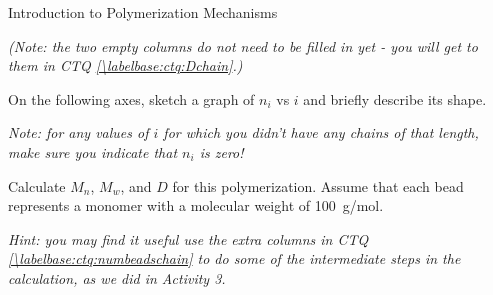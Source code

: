 \begin{activity}{Introduction to Polymerization Mechanisms}
\begin{ctqs}
		\emph{(Note: the two empty columns do not need to be filled in yet - you will get to them in CTQ \ref{\labelbase:ctq:Dchain}.)}
		
	\question On the following axes, sketch a graph of $n_i$ vs $i$ and briefly describe its shape. \label{\labelbase:ctq:MWDchain}
	
		\emph{Note: for any values of $i$ for which you didn't have any chains of that length, make sure you indicate that $n_i$ is zero!}
	
		\begin{solution}[2.5in]\end{solution}
	
	\question Calculate $M_n$, $M_w$, and $D$ for this polymerization.  Assume that each bead represents a monomer with a molecular weight of 100~g/mol. \label{\labelbase:ctq:Dchain}
	
		\emph{Hint: you may find it useful use the extra columns in CTQ \ref{\labelbase:ctq:numbeadschain} to do some of the intermediate steps in the calculation, as we did in Activity 3.}
	
		\begin{solution}[2.5in]\end{solution}
	

\end{ctqs}
\end{activity}
